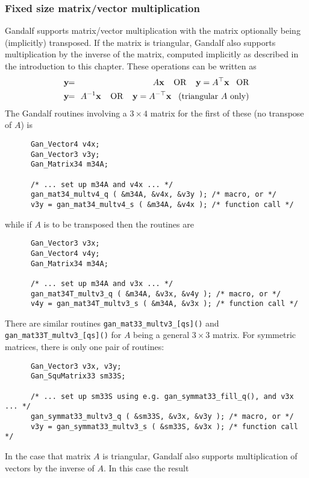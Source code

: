 \subsubsection{Fixed size matrix/vector multiplication}
Gandalf supports matrix/vector multiplication with the matrix optionally
being (implicitly) transposed. If the matrix is triangular, Gandalf also
supports multiplication by the inverse of the matrix, computed implicitly
as described in the introduction to this chapter.
These operations can be written as
\begin{eqnarray}
 \yvec &\!\!=\!\!& A\xvec\;\;\;\;\mbox{OR}\;\;\;\; \yvec = A\tr\xvec\;\;\;\mbox{OR} \nonumber \\
 \yvec &\!\!=\!\!& A\inv\xvec\;\;\;\;\mbox{OR}\;\;\;\; \yvec = A\trinv\xvec\;\;\;\mbox{(triangular $A$ only)} \nonumber
\end{eqnarray}
The Gandalf routines involving a $3\times 4$ matrix for the first of these
(no transpose of $A$) is
\begin{verbatim}
      Gan_Vector4 v4x;
      Gan_Vector3 v3y;
      Gan_Matrix34 m34A;

      /* ... set up m34A and v4x ... */
      gan_mat34_multv4_q ( &m34A, &v4x, &v3y ); /* macro, or */
      v3y = gan_mat34_multv4_s ( &m34A, &v4x ); /* function call */
\end{verbatim}
while if $A$ is to be transposed then the routines are
\begin{verbatim}
      Gan_Vector3 v3x;
      Gan_Vector4 v4y;
      Gan_Matrix34 m34A;

      /* ... set up m34A and v3x ... */
      gan_mat34T_multv3_q ( &m34A, &v3x, &v4y ); /* macro, or */
      v4y = gan_mat34T_multv3_s ( &m34A, &v3x ); /* function call */
\end{verbatim}
There are similar routines {\tt gan\_mat33\_multv3\_[qs]()} and
{\tt gan\_mat33T\_multv3\_[qs]()} for $A$ being a general $3\times 3$ matrix.
For symmetric matrices, there is only one pair of routines:
\begin{verbatim}
      Gan_Vector3 v3x, v3y;
      Gan_SquMatrix33 sm33S;

      /* ... set up sm33S using e.g. gan_symmat33_fill_q(), and v3x ... */
      gan_symmat33_multv3_q ( &sm33S, &v3x, &v3y ); /* macro, or */
      v3y = gan_symmat33_multv3_s ( &sm33S, &v3x ); /* function call */
\end{verbatim}
In the case that matrix $A$ is triangular, Gandalf also supports
multiplication of vectors by the inverse of $A$. In this case the result
